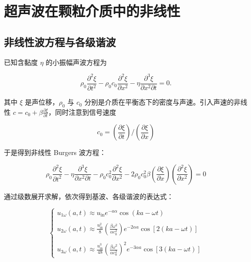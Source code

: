 \section{超声波在颗粒介质中的非线性}


\subsection{非线性波方程与各级谐波}

已知含黏度 $\eta$ 的小振幅声波方程为

\begin{equation}
  \rho_{0}\frac{\partial^{2}\xi}{\partial t^{2}} - \rho_{0}c_{0}\frac{\partial^{2}\xi}{\partial x^{2}} - \eta\frac{\partial^{3}\xi}{\partial x^{2}\partial t} = 0.
\end{equation}

其中 $\xi$ 是声位移，$\rho_{0}$ 与 $c_{0}$ 分别是介质在平衡态下的密度与声速。引入声速的非线性 $c = c_{0} + \beta\frac{\partial\xi}{\partial t}$，同时注意到信号速度

\begin{equation}
  c_{0} = \left(\frac{\partial \xi}{\partial t}\right)/\left(\frac{\partial\xi}{\partial x}\right)
\end{equation}

于是得到非线性 Burgers 波方程：


\begin{equation}
  \rho_{0}\frac{\partial^{2}\xi}{\partial t^{2}} - \eta\frac{\partial^{3}\xi}{\partial x^{2}\partial t} - \rho_{0}c_{0}^{2}\frac{\partial^{2}\xi}{\partial x^{2}} - 2\rho_{0}c_{0}^{2}\beta\left(\frac{\partial \xi}{\partial x}\right)\left(\frac{\partial^{2} \xi}{\partial x^{2}}\right) = 0
\end{equation}

通过级数展开求解，依次得到基波、各级谐波的表达式：

\begin{equation}
  \begin{cases}
    u_{1\omega}(a,t) \approx u_{\text{in}}e^{-a\alpha}\cos{(ka-\omega t)}\\
    \\
    u_{2\omega}(a,t) \approx \frac{u_{\text{in}}^{2}}{8}\left(\frac{\beta\omega^{2}}{\alpha c_{0}^{2}}\right)e^{-2\alpha a}\cos{[2(ka-\omega t)]}\\
    \\
    u_{3\omega}(a,t) \approx \frac{u_{\text{in}}^{3}}{48}\left(\frac{\beta\omega^{2}}{\alpha c_{0}^{2}}\right)^{2}e^{-3\alpha a}\cos{[3(ka-\omega t)]}
    \end{cases}
\end{equation}

